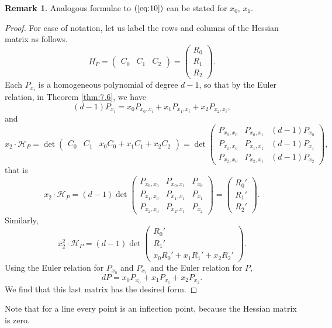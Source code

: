 \documentclass{article}
\renewcommand{\H}{\mathcal{H}}
\newcommand{\rb}[1]{\left( #1 \right)}
\newcommand{\three}[3]{\begin{pmatrix} #1 & #2 & #3 \end{pmatrix}}
\theoremstyle{definition}\newtheorem{definition}{Definition}[section]
\theoremstyle{definition}\newtheorem{notation}[definition]{Notation}
\theoremstyle{definition}\newtheorem{remark}[definition]{Remark}
\theoremstyle{definition}\newtheorem{example1}[definition]{Example}
\theoremstyle{definition}\newtheorem{fact}{Fact}
\theoremstyle{definition}\newtheorem{exercise}{Exercise}
\theoremstyle{definition}\newtheorem*{example2}{Example}
\begin{document}
\begin{remark}
Analogous formulae to $ \rb{\ref{eq:10}} $ can be stated for $ x_0 $, $ x_1 $.
\end{remark}


\begin{proof}
For ease of notation, let us label the rows and columns of the Hessian matrix as follows.
$$ H_P = \three{C_0}{C_1}{C_2} = \begin{pmatrix}
R_0 \\
R_1 \\
R_2
\end{pmatrix}. $$
Each $ P_{x_i} $ is a homogeneous polynomial of degree $ d - 1 $, so that by the Euler relation, in Theorem \ref{thm:7.6}, we have
$$ \rb{d - 1}P_{x_i} = x_0P_{x_0, x_i} + x_1P_{x_1, x_i} + x_2P_{x_2, x_i}, $$
and
$$ x_2 \cdot \H_P = \det\three{C_0}{C_1}{x_0C_0 + x_1C_1 + x_2C_2} = \det\begin{pmatrix}
P_{x_0, x_0} & P_{x_0, x_1} & \rb{d - 1}P_{x_0} \\
P_{x_1, x_0} & P_{x_1, x_1} & \rb{d - 1}P_{x_1} \\
P_{x_2, x_0} & P_{x_2, x_1} & \rb{d - 1}P_{x_2}
\end{pmatrix}, $$
that is
$$ x_2 \cdot \H_P = \rb{d - 1}\det\begin{pmatrix}
P_{x_0, x_0} & P_{x_0, x_1} & P_{x_0} \\
P_{x_1, x_0} & P_{x_1, x_1} & P_{x_1} \\
P_{x_2, x_0} & P_{x_2, x_1} & P_{x_2}
\end{pmatrix} = \begin{pmatrix}
R_0' \\
R_1' \\
R_2'
\end{pmatrix}. $$
Similarly,
$$ x_2^2 \cdot \H_P = \rb{d - 1}\det\begin{pmatrix}
R_0' \\
R_1' \\
x_0R_0' + x_1R_1' + x_2R_2'
\end{pmatrix}. $$
Using the Euler relation for $ P_{x_0} $ and $ P_{x_1} $ and the Euler relation for $ P $,
$$ dP = x_0P_{x_0} + x_1P_{x_1} + x_2P_{x_2}. $$
We find that this last matrix has the desired form.
\end{proof}

Note that for a line every point is an inflection point, because the Hessian matrix is zero.
\end{document}
